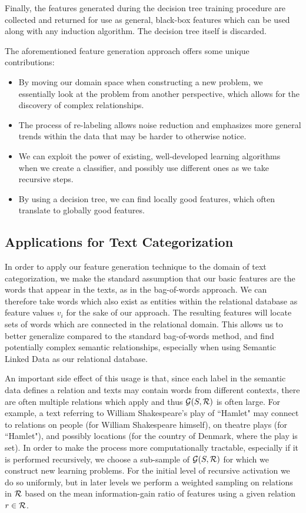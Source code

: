 \documentclass[twoside,11pt]{article}
\theoremstyle{definition}
\begin{document}
Finally, the features generated during the decision tree training procedure are collected and returned for use as general, black-box features which can be used along with any induction algorithm. The decision tree itself is discarded.

The aforementioned feature generation approach offers some unique contributions:
\begin{itemize}
	\item By moving our domain space when constructing a new problem, we essentially look at the problem from another perspective, which allows for the discovery of complex relationships.
	\item The process of re-labeling allows noise reduction and emphasizes more general trends within the data that may be harder to otherwise notice.
	\item We can exploit the power of existing, well-developed learning algorithms when we create a classifier, and possibly use different ones as we take recursive steps.
	\item By using a decision tree, we can find locally good features, which often translate to globally good features.
\end{itemize}


\subsection{Applications for Text Categorization}
In order to apply our feature generation technique to the domain of text categorization, we make the standard assumption that our basic features are the words that appear in the texts, as in the bag-of-words \cite{Wu:1981:CST:1013228.511759,salton1983introduction} approach. We can therefore take words which also exist as entities within the relational database as feature values $v_i$ for the sake of our approach.
The resulting features will locate sets of words which are connected in the relational domain. This allows us to better generalize compared to the standard bag-of-words method, and find potentially complex semantic relationships, especially when using Semantic Linked Data as our relational database.

An important side effect of this usage is that, since each label in the semantic data defines a relation and texts may contain words from different contexts, there are often multiple relations which apply and thus ${\cal G}(S,{\cal R})$ is often large. For example, a text referring to William Shakespeare's play of ``Hamlet" may connect to relations on people (for William Shakespeare himself), on theatre plays (for ``Hamlet"), and possibly locations (for the country of Denmark, where the play is set).
In order to make the process more computationally tractable, especially if it is performed recursively, we choose a sub-sample of ${\cal G}(S,{\cal R})$ for which we construct new learning problems. For the initial level of recursive activation we do so uniformly, but in later levels we perform a weighted sampling on relations in ${\cal R}$ based on the mean information-gain ratio of features using a given relation $r\in{\cal R}$.
\end{document}
